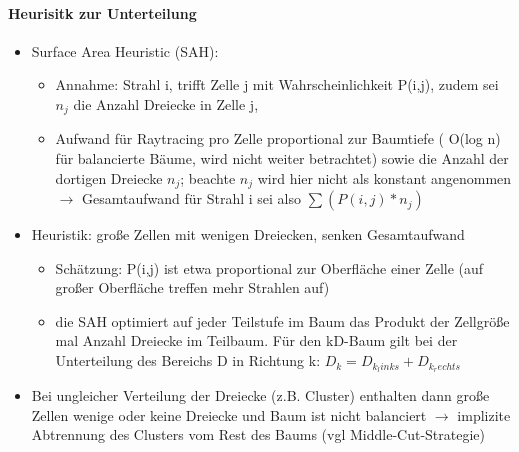 \documentclass[10pt,landscape]{article}
\begin{document}
\begin{multicols}{3}
  \paragraph*{Heurisitk zur Unterteilung}
  \begin{itemize}
    \item Surface Area Heuristic (SAH):
          \begin{itemize}
            \item Annahme: Strahl i, trifft Zelle j mit Wahrscheinlichkeit P(i,j), zudem sei $n_j$ die Anzahl Dreiecke in Zelle j,
            \item Aufwand für Raytracing pro Zelle proportional zur Baumtiefe ( O(log n) für balancierte Bäume, wird nicht weiter betrachtet) sowie die Anzahl der dortigen Dreiecke $n_j$; beachte $n_j$ wird hier nicht als konstant angenommen $\rightarrow$ Gesamtaufwand für Strahl i sei also $\sum(P(i,j)*n_j)$
          \end{itemize}
    \item Heuristik: große Zellen mit wenigen Dreiecken, senken Gesamtaufwand
          \begin{itemize}
            \item Schätzung: P(i,j) ist etwa proportional zur Oberfläche einer Zelle (auf großer Oberfläche treffen mehr Strahlen auf)
            \item die SAH optimiert auf jeder Teilstufe im Baum das Produkt der Zellgröße mal Anzahl Dreiecke im Teilbaum. Für den kD-Baum gilt bei der Unterteilung des Bereichs D in Richtung k: $D_k = D_{k_links} + D_{k_rechts}$
          \end{itemize}
    \item Bei ungleicher Verteilung der Dreiecke (z.B. Cluster) enthalten dann große Zellen wenige oder keine Dreiecke und Baum ist nicht balanciert $\rightarrow$ implizite Abtrennung des Clusters vom Rest des Baums (vgl Middle-Cut-Strategie)
  \end{itemize}
  

\end{multicols}
\end{document}
